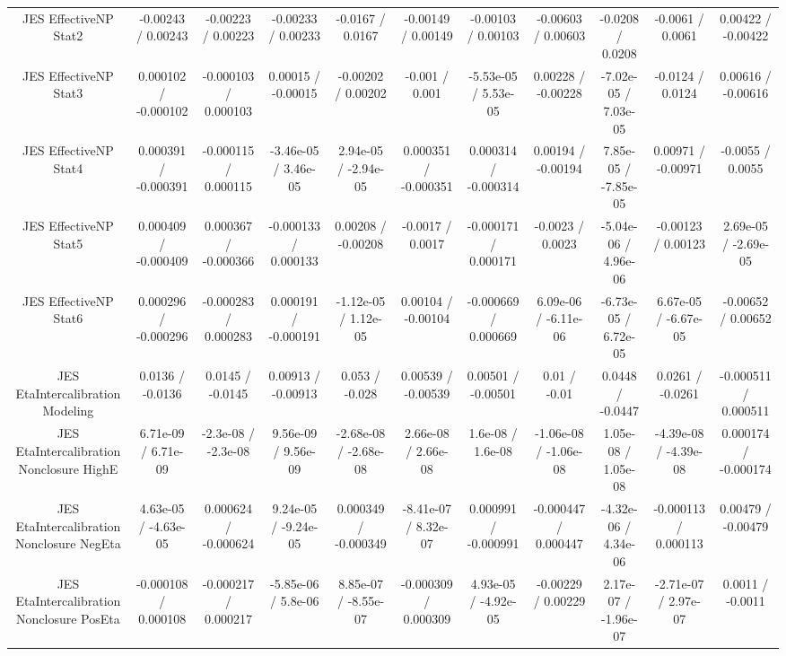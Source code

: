 \begin{table}[htbp]
\begin{center}
\begin{tabular}{|c|c|c|c|c|c|c|c|c|c|c|}
  JES EffectiveNP Stat2 & -0.00243 / 0.00243 & -0.00223 / 0.00223 & -0.00233 / 0.00233 & -0.0167 / 0.0167 & -0.00149 / 0.00149 & -0.00103 / 0.00103 & -0.00603 / 0.00603 & -0.0208 / 0.0208 & -0.0061 / 0.0061 & 0.00422 / -0.00422 \\ 
  JES EffectiveNP Stat3 & 0.000102 / -0.000102 & -0.000103 / 0.000103 & 0.00015 / -0.00015 & -0.00202 / 0.00202 & -0.001 / 0.001 & -5.53e-05 / 5.53e-05 & 0.00228 / -0.00228 & -7.02e-05 / 7.03e-05 & -0.0124 / 0.0124 & 0.00616 / -0.00616 \\ 
  JES EffectiveNP Stat4 & 0.000391 / -0.000391 & -0.000115 / 0.000115 & -3.46e-05 / 3.46e-05 & 2.94e-05 / -2.94e-05 & 0.000351 / -0.000351 & 0.000314 / -0.000314 & 0.00194 / -0.00194 & 7.85e-05 / -7.85e-05 & 0.00971 / -0.00971 & -0.0055 / 0.0055 \\ 
  JES EffectiveNP Stat5 & 0.000409 / -0.000409 & 0.000367 / -0.000366 & -0.000133 / 0.000133 & 0.00208 / -0.00208 & -0.0017 / 0.0017 & -0.000171 / 0.000171 & -0.0023 / 0.0023 & -5.04e-06 / 4.96e-06 & -0.00123 / 0.00123 & 2.69e-05 / -2.69e-05 \\ 
  JES EffectiveNP Stat6 & 0.000296 / -0.000296 & -0.000283 / 0.000283 & 0.000191 / -0.000191 & -1.12e-05 / 1.12e-05 & 0.00104 / -0.00104 & -0.000669 / 0.000669 & 6.09e-06 / -6.11e-06 & -6.73e-05 / 6.72e-05 & 6.67e-05 / -6.67e-05 & -0.00652 / 0.00652 \\ 
  JES EtaIntercalibration Modeling & 0.0136 / -0.0136 & 0.0145 / -0.0145 & 0.00913 / -0.00913 & 0.053 / -0.028 & 0.00539 / -0.00539 & 0.00501 / -0.00501 & 0.01 / -0.01 & 0.0448 / -0.0447 & 0.0261 / -0.0261 & -0.000511 / 0.000511 \\ 
  JES EtaIntercalibration Nonclosure HighE & 6.71e-09 / 6.71e-09 & -2.3e-08 / -2.3e-08 & 9.56e-09 / 9.56e-09 & -2.68e-08 / -2.68e-08 & 2.66e-08 / 2.66e-08 & 1.6e-08 / 1.6e-08 & -1.06e-08 / -1.06e-08 & 1.05e-08 / 1.05e-08 & -4.39e-08 / -4.39e-08 & 0.000174 / -0.000174 \\ 
  JES EtaIntercalibration Nonclosure NegEta & 4.63e-05 / -4.63e-05 & 0.000624 / -0.000624 & 9.24e-05 / -9.24e-05 & 0.000349 / -0.000349 & -8.41e-07 / 8.32e-07 & 0.000991 / -0.000991 & -0.000447 / 0.000447 & -4.32e-06 / 4.34e-06 & -0.000113 / 0.000113 & 0.00479 / -0.00479 \\ 
  JES EtaIntercalibration Nonclosure PosEta & -0.000108 / 0.000108 & -0.000217 / 0.000217 & -5.85e-06 / 5.8e-06 & 8.85e-07 / -8.55e-07 & -0.000309 / 0.000309 & 4.93e-05 / -4.92e-05 & -0.00229 / 0.00229 & 2.17e-07 / -1.96e-07 & -2.71e-07 / 2.97e-07 & 0.0011 / -0.0011 \\ 

\end{tabular}
\end{center}
\end{table}
